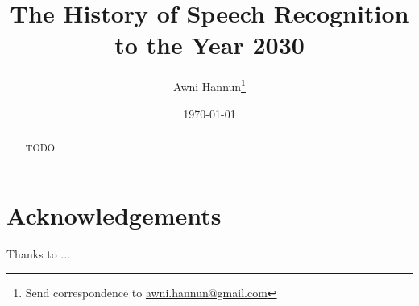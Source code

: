 \documentclass[twocolumn, 12pt]{article}
\title{The History of Speech Recognition to the Year 2030}
\author{Awni Hannun\footnote{
  Send correspondence to
  \href{mailto:awni.hannun@gmail.com}{awni.hannun@gmail.com}}}
\date{\today}
\begin{document}
\maketitle

\begin{abstract}
    TODO
\end{abstract}





\section*{\large Acknowledgements}
Thanks to ...



\end{document}
